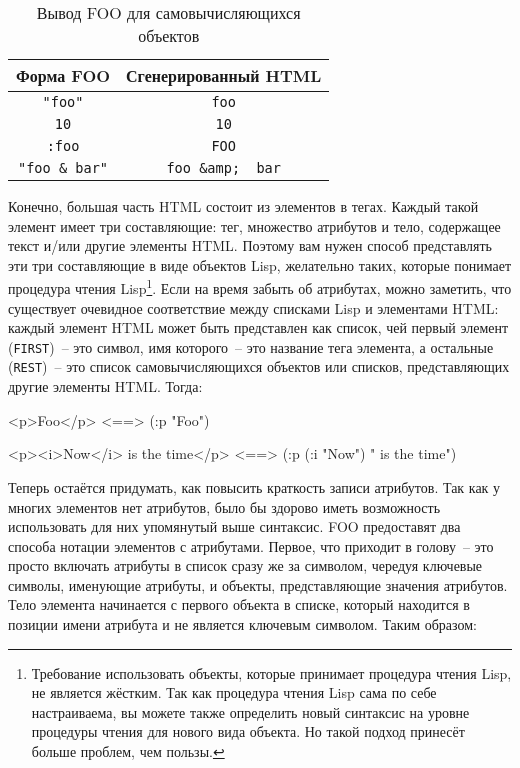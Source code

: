 \begin{table}[tb]
\centering{}
\begin{tabular}{|c|c|}
\hline
  Форма FOO & Сгенерированный HTML \\
\hline
  \lstinline!"foo"! &\lstinline!foo! \\
  \lstinline!10! & \lstinline!10! \\
  \lstinline!:foo! & \lstinline!FOO! \\
  \lstinline!"foo & bar"! & \lstinline!foo &amp;  bar!\\
\hline
\end{tabular}
  \caption{Вывод FOO для самовычисляющихся объектов} 
  \label{table:30-1}
\end{table}

Конечно, большая часть HTML состоит из элементов в тегах. Каждый такой элемент имеет три
составляющие: тег, множество атрибутов и тело, содержащее текст и/или другие элементы
HTML. Поэтому вам нужен способ представлять эти три составляющие в виде объектов Lisp,
желательно таких, которые понимает процедура чтения Lisp\footnote{Требование использовать
  объекты, которые принимает процедура чтения Lisp, не является жёстким. Так как процедура
  чтения Lisp сама по себе настраиваема, вы можете также определить новый синтаксис на
  уровне процедуры чтения для нового вида объекта. Но такой подход принесёт больше
  проблем, чем пользы.}. Если на время забыть об атрибутах, можно заметить, что существует
очевидное соответствие между списками Lisp и элементами HTML: каждый элемент HTML может
быть представлен как список, чей первый элемент (\lstinline{FIRST})~-- это символ, имя
которого~-- это название тега элемента, а остальные (\lstinline{REST})~-- это список
самовычисляющихся объектов или списков, представляющих другие элементы HTML. Тог\-да:

\begin{myverb}
<p>Foo</p> <==> (:p "Foo")

<p><i>Now</i> is the time</p> <==> (:p (:i "Now") " is the time")
\end{myverb}

Теперь остаётся придумать, как повысить краткость записи атрибутов. Так как у многих
элементов нет атрибутов, было бы здорово иметь возможность использовать для них упомянутый
выше синтаксис. FOO предоставят два способа нотации элементов с атрибутами. Первое, что
приходит в голову~-- это просто включать атрибуты в список сразу же за символом, чередуя
ключевые символы, именующие атрибуты, и объекты, представляющие значения атрибутов. Тело
элемента начинается с первого объекта в списке, который находится в позиции имени атрибута
и не является ключевым символом. Таким образом:

